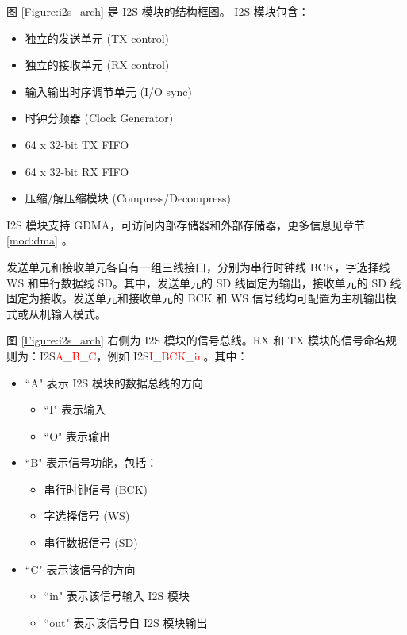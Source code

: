 \documentclass[main\_\_CN.tex]{subfiles}
\begin{document}
图 \ref{Figure:i2s_arch} 是 \chipname{} I2S 模块的结构框图。\chipname{} I2S 模块包含：
\begin{itemize}
    \item 独立的发送单元 (TX control)
    \item 独立的接收单元 (RX control)
    \item 输入输出时序调节单元 (I/O sync)
    \item 时钟分频器 (Clock Generator)
    \item 64 x 32-bit TX FIFO
    \item 64 x 32-bit RX FIFO
    \item 压缩/解压缩模块 (Compress/Decompress)
\end{itemize}
\chipname{} I2S 模块支持 GDMA，可访问内部存储器和外部存储器，更多信息见章节 \ref{mod:dma} \textit{}。


发送单元和接收单元各自有一组三线接口，分别为串行时钟线 BCK，字选择线 WS 和串行数据线 SD。其中，发送单元的 SD 线固定为输出，接收单元的 SD 线固定为接收。发送单元和接收单元的 BCK 和 WS 信号线均可配置为主机输出模式或从机输入模式。



图 \ref{Figure:i2s_arch} 右侧为 I2S 模块的信号总线。RX 和 TX 模块的信号命名规则为：I2S\textcolor{red}{A}\_\textcolor{red}{B}\_\textcolor{red}{C}，例如 I2S\textcolor{red}{I}\_\textcolor{red}{BCK}\_\textcolor{red}{in}。其中：

\begin{itemize}
    \item ``A" 表示 I2S 模块的数据总线的方向
    \begin{itemize}
        \item ``I" 表示输入
        \item ``O" 表示输出
    \end{itemize}
    \item ``B" 表示信号功能，包括：
    \begin{itemize}
        \item 串行时钟信号 (BCK)
        \item 字选择信号 (WS)
        \item 串行数据信号 (SD)
    \end{itemize}
    \item ``C" 表示该信号的方向
    \begin{itemize}
        \item ``in" 表示该信号输入 I2S 模块
        \item ``out" 表示该信号自 I2S 模块输出
    \end{itemize}
\end{itemize}
\end{document}
